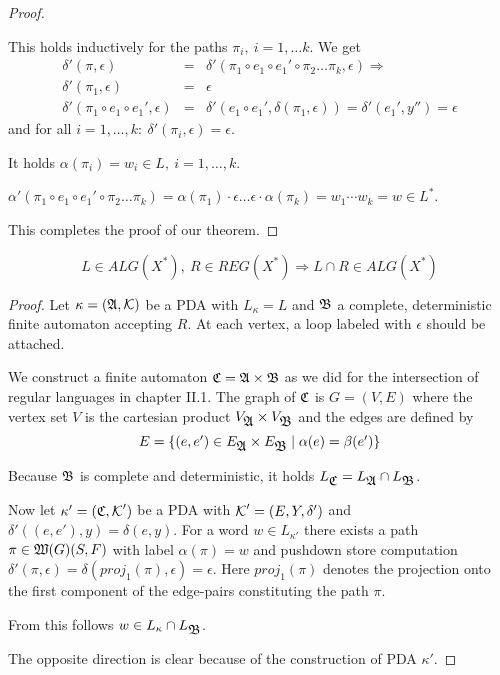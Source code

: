 \begin{proof}
\begin{enumerate}
  This holds inductively for the paths $\pi_i,\ i = 1, \ldots k$. We get
  \begin{eqnarray*}
  \delta'(\pi, \epsilon) &=& \delta'(\pi_1 \circ e_1 \circ e_1' \circ \pi_2
  \ldots \pi_k, \epsilon) \Rightarrow \\
  \delta'(\pi_1, \epsilon) &=& \epsilon \\
  \delta'(\pi_1 \circ e_1 \circ e_1', \epsilon) &=& \delta'(e_1 \circ e_1',
  \delta(\pi_1, \epsilon)) = \delta'(e_1', y'') = \epsilon
  \end{eqnarray*}
  and for all $i = 1, \ldots, k:\ \delta'(\pi_i, \epsilon) = \epsilon$. 
  
  It holds $\alpha(\pi_i) = w_i \in L,\ i = 1, \ldots, k$.
  
  $\alpha'(\pi_1 \circ e_1 \circ e_1' \circ \pi_2 \ldots \pi_k) = \alpha(\pi_1)
  \cdot \epsilon \ldots \epsilon \cdot \alpha(\pi_k) = w_1 \cdots w_k = w \in
  L^*$.
\end{enumerate}

This completes the proof of our theorem.
\end{proof}

\bigskip
\begin{theorem}
\[ L \in ALG(X^*),\ R \in REG(X^*) \Rightarrow L \cap R \in ALG(X^*) \]
\end{theorem}

\begin{proof}
Let $\kappa = (\mbox{$\mathfrak{A}$}, \mbox{$\mathcal{K}$})$ be a PDA with $L_{\kappa} = L$ and $\mbox{$\mathfrak{B}$}$
a complete, deterministic finite automaton accepting $R$. At each vertex, a loop
labeled with $\epsilon$ should be attached.

We construct a finite automaton $\mbox{$\mathfrak{C}$} = \mbox{$\mathfrak{A}$} \times \mbox{$\mathfrak{B}$}$ as we did for
the intersection of regular languages in chapter II.1. The graph of $\mbox{$\mathfrak{C}$}$ is
$G = (V, E)$ where the vertex set $V$ is the cartesian product $V_{\mbox{$\mathfrak{A}$}}
\times V_{\mbox{$\mathfrak{B}$}}$ and the edges are defined by
\[ E = \mbox{$\{(e, e') \in E_{\mbox{$\mathfrak{A}$}} \times E_{\mbox{$\mathfrak{B}$}} \mid \alpha(e) =
\beta(e') \}$} \]

Because $\mbox{$\mathfrak{B}$}$ is complete and deterministic, it holds $L_{\mbox{$\mathfrak{C}$}} =
L_{\mbox{$\mathfrak{A}$}} \cap L_{\mbox{$\mathfrak{B}$}}$.

Now let $\kappa' = (\mbox{$\mathfrak{C}$}, \mbox{$\mathcal{K}$}')$ be a PDA with $\mbox{$\mathcal{K}$}' = (E,
Y, \delta')$ and $\delta'((e, e'), y) = \delta(e, y)$.
For a word $w \in L_{\kappa'}$ there exists a path $\pi \in
\mbox{$\mathfrak{W}(G)$}(S, F)$ with label $\alpha(\pi) = w$ and pushdown store
computation $\delta'(\pi, \epsilon) = \delta(proj_1(\pi), \epsilon) = \epsilon$.
Here $proj_1(\pi)$ denotes the projection onto the first component of the
edge-pairs constituting the path $\pi$.

From this follows $w \in L_{\kappa} \cap L_{\mbox{$\mathfrak{B}$}}$.

The opposite direction is clear because of the construction of PDA $\kappa'$.
\end{proof}

